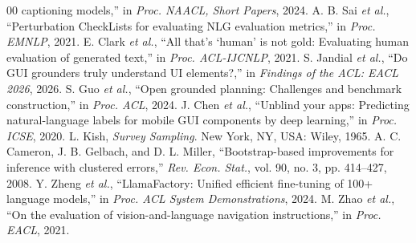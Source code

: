 \documentclass[conference]{IEEEtran}
\begin{document}
\begin{thebibliography}{00}
captioning models,'' in \emph{Proc. NAACL, Short Papers}, 2024.
 A. B. Sai \emph{et al.},
``Perturbation CheckLists for evaluating NLG evaluation metrics,'' in
\emph{Proc. EMNLP}, 2021.
 E. Clark \emph{et al.}, ``All that's `human' is not gold: Evaluating human evaluation of
generated text,'' in \emph{Proc. ACL-IJCNLP}, 2021.
 S. Jandial \emph{et al.},
``Do GUI grounders truly understand UI elements?,'' in \emph{Findings of the ACL: EACL 2026}, 2026.
 S. Guo \emph{et al.}, ``Open grounded
planning: Challenges and benchmark construction,'' in \emph{Proc. ACL}, 2024.
 J. Chen \emph{et al.}, ``Unblind your apps: Predicting natural-language labels for mobile GUI components by deep learning,'' in \emph{Proc. ICSE}, 2020.
 L. Kish, \emph{Survey Sampling}. New York, NY, USA: Wiley, 1965.
 A. C. Cameron, J. B. Gelbach, and D. L. Miller,
``Bootstrap-based improvements for inference with clustered errors,'' \emph{Rev. Econ.
Stat.}, vol. 90, no. 3, pp. 414--427, 2008.
 Y. Zheng \emph{et al.},
``LlamaFactory: Unified efficient fine-tuning of 100+ language models,'' in
\emph{Proc. ACL System Demonstrations}, 2024.
 M. Zhao \emph{et al.}, ``On the evaluation of vision-and-language navigation instructions,'' in \emph{Proc. EACL}, 2021.

\end{thebibliography}
\end{document}
